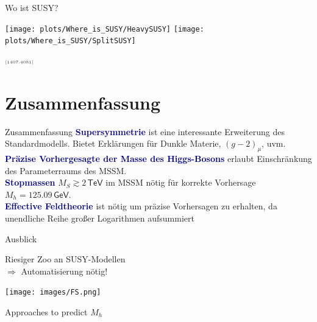 \documentclass[hyperref={pdfpagelabels=false},ngerman]{beamer}
\newcommand{\eh}[1]{\,\mathsf{#1}}
\newcommand{\MS}{\ensuremath{M_S}}
\newcommand{\mycite}[1]{\ensuremath{\text{\textcolor{darkgray}{\tiny [#1]}}}}
\renewcommand{\emph}[1]{\textbf{\textcolor{darkblue}{#1}}}
\newcommand{\GeV}{\eh{GeV}}
\newcommand{\TeV}{\eh{TeV}}
\begin{document}
\begin{frame}{Wo ist SUSY?}
  \begin{center}
    \texttt{[image: plots/Where\_is\_SUSY/HeavySUSY]}\hfill
    \texttt{[image: plots/Where\_is\_SUSY/SplitSUSY]}
  \end{center}
  \mycite{1407.4081}
\end{frame}


\section{Zusammenfassung}

\begin{frame}{Zusammenfassung}
  \emph{Supersymmetrie} ist eine interessante Erweiterung des
  Standardmodells.  Bietet Erklärungen für Dunkle Materie,
  $(g-2)_\mu$, uvm.
  \\[1em]
  \emph{Präzise Vorhergesagte der Masse des Higgs-Bosons} erlaubt
  Einschränkung des Parameterraums des MSSM.
  \\[1em]
  \emph{Stopmassen} $\MS \gtrsim 2\TeV$ im MSSM nötig für korrekte
  Vorhersage $M_h = 125.09\GeV$.
  \\[1em]
  \emph{Effective Feldtheorie} ist nötig um präzise Vorhersagen zu
  erhalten, da unendliche Reihe großer Logarithmen aufsummiert
\end{frame}

\begin{frame}{Ausblick}
  \begin{center}
    \LARGE Riesiger Zoo an SUSY-Modellen\\ $\Rightarrow$ Automatisierung nötig!
  \end{center}
  \begin{center}
    \texttt{[image: images/FS.png]}
  \end{center}
\end{frame}

\begin{frame}{Approaches to predict $M_h$}
  \begin{center}
  \end{center}
\end{frame}
\end{document}
